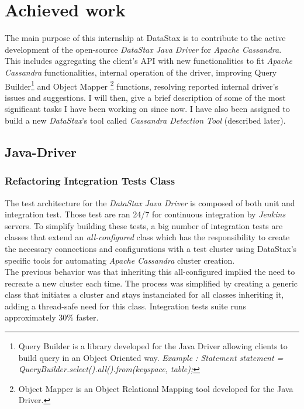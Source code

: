 \documentclass[a4paper]{report}
\newcommand{\ds}{\emph{DataStax\xspace}}
\newcommand{\djd}{\emph{DataStax Java Driver\xspace}}
\newcommand{\ca}{\emph{Apache Cassandra\xspace}}
\begin{document}
\chapter{Achieved work}
The main purpose of this internship at DataStax is to contribute to the active development of the open-source \djd{} for \ca{}. This includes aggregating the client's API with new functionalities to fit \ca{} functionalities, internal operation of the driver, improving Query Builder\footnote{Query Builder is a library developed for the Java Driver allowing clients to build query in an Object Oriented way. \textit{Example : Statement statement = QueryBuilder.select().all().from(keyspace, table);}} 
and Object Mapper \footnote{Object Mapper is an Object Relational Mapping tool developed for the Java Driver.} 
functions, resolving reported internal driver's issues and suggestions. I will then, give a brief description of some of the most significant tasks I have been working on since now. I have also been assigned to build a new \ds{}'s tool called \emph{Cassandra Detection Tool} (described later).

\section{Java-Driver}
\subsection{Refactoring Integration Tests Class}
The test architecture for the \djd{} is composed of both unit and integration test. Those test are ran 24/7 for continuous integration by \emph{Jenkins} servers. To simplify building these tests, a big number of integration tests are classes that extend an \emph{all-configured} class which has the responsibility to create the necessary connections and configurations with a test cluster using DataStax's specific tools for automating \ca{} cluster creation.\\
The previous behavior was that inheriting this all-configured implied the need to recreate a new cluster each time. The process was simplified by creating a generic class that initiates a cluster and stays instanciated for all classes inheriting it, adding a thread-safe need for this class. Integration tests suite runs approximately 30\% faster.
\end{document}
